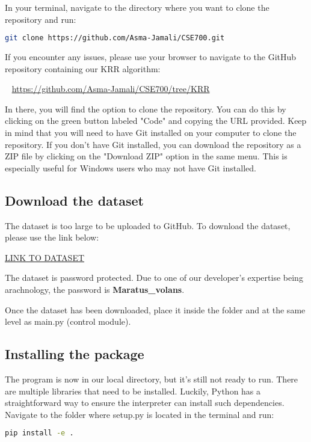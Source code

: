 \documentclass{article}
\begin{document}
In your terminal, navigate to the directory where you want to clone the repository and run:

\begin{lstlisting}[language=bash]
    git clone https://github.com/Asma-Jamali/CSE700.git
\end{lstlisting}

If you encounter any issues, please use your browser to navigate to the GitHub repository containing our KRR algorithm:

~\newline
\href{https://github.com/Asma-Jamali/CSE700/tree/KRR}{https://github.com/Asma-Jamali/CSE700/tree/KRR}
~\newline 

In there, you will find the option to clone the repository. You can do this by clicking on the green button labeled "Code" and copying the URL provided.
Keep in mind that you will need to have Git installed on your computer to clone the repository.
If you don't have Git installed, you can download the repository as a ZIP file by clicking on the "Download ZIP" option in the same menu.
This is especially useful for Windows users who may not have Git installed.

\subsection{Download the dataset}
The dataset is too large to be uploaded to GitHub. To download the dataset, please use the link below:

\href{https://mcmasteru365-my.sharepoint.com/:f:/g/personal/garcilau_mcmaster_ca/El34gk2N9_lPkw9xiCZU5_kBwu6Xg1YPbDJVekdcor7IkQ?e=3Uvl8c}{LINK TO DATASET}

The dataset is password protected. Due to one of our developer's expertise being arachnology, the password is \textbf{Maratus\_volans}.

Once the dataset has been downloaded, place it inside the folder and at the same level as main.py (control module).

\subsection{Installing the package}

The program is now in our local directory, but it's still not ready to run. There are multiple libraries 
that need to be installed. Luckily, Python has a straightforward way to ensure the interpreter can install such dependencies.
Navigate to the folder where setup.py is located in the terminal and run:
\begin{lstlisting}[language=bash]
    pip install -e .
\end{lstlisting}
\end{document}
